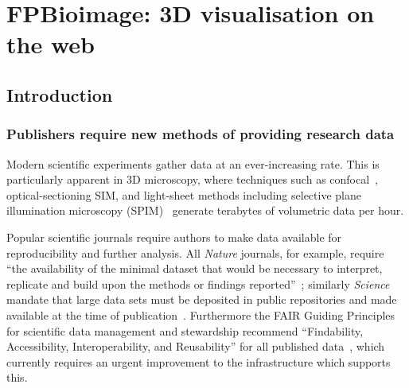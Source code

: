 \chapter{FPBioimage: 3D visualisation on the web} \label{chap:FPB}



\ifpdf
    \graphicspath{{Chapter3/Figs/Raster/}{Chapter3/Figs/PDF/}{Chapter3/Figs/}}
\else
    \graphicspath{{Chapter3/Figs/Vector/}{Chapter3/Figs/}}
\fi

%

\section{Introduction}
\subsection{Publishers require new methods of providing research data} \label{sec:introvisual}
Modern scientific experiments gather data at an ever-increasing rate. 
This is particularly apparent in 3D microscopy, where techniques such as confocal~\cite{marvin1961microscopy}, optical-sectioning SIM, and light-sheet methods including selective plane illumination microscopy (SPIM)~\cite{huisken2004optical} generate terabytes of volumetric data per hour. 

Popular scientific journals require authors to make data available for reproducibility and further analysis. 
All \textit{Nature} journals, for example, require ``the availability of the minimal dataset that would be necessary to interpret, replicate and build upon the methods or findings reported''~\cite{naturedata}; similarly \textit{Science} mandate that large data sets must be deposited in public repositories and made available at the time of publication~\cite{sciencedata}.
Furthermore the FAIR Guiding Principles for scientific data management and stewardship recommend ``Findability, Accessibility, Interoperability, and Reusability'' for all published data~\cite{wilkinson2016fair}, which currently requires an urgent improvement to the infrastructure which supports this. 

